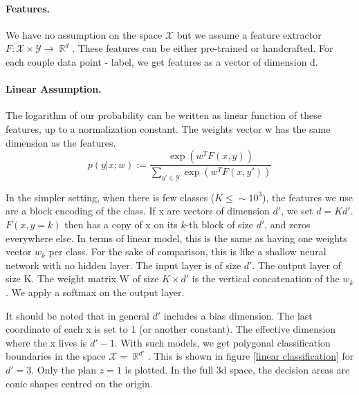 \documentclass{article}
\DeclareMathOperator{\R}{\mathbb{R}}
\DeclareMathOperator{\1}{\mathbb{1}}
\begin{document}
\paragraph{Features.}
We have no assumption on the space $\mathcal{X}$ but we assume a feature extractor $F:\mathcal{X}\times \mathcal{Y} \rightarrow \R^d$.
These features can be either pre-trained or handcrafted.
For each couple data point - label, we get features as a vector of dimension d.

\paragraph{Linear Assumption.}
The logarithm of our probability can be written as linear function of these features, up to a normalization constant.
The weights vector w has the same dimension as the features.
\begin{equation}
	\label{primal probability}
	p(y | x ; w) := \frac{\exp(w^TF(x, y))}{\sum_{y' \in \mathcal{Y}} \exp(w^TF(x, y'))}
\end{equation}

In the simpler setting, when there is few classes ($K \leq \sim 10^3$), the features we use are a block encoding of the class.
If x are vectors of dimension $d'$, we set $d=Kd'$. $F(x, y=k)$ then has a copy of x on its $k$-th block of size $d'$, and zeros everywhere else.
In terms of linear model, this is the same as having one weights vector $w_k$ per class.
For the sake of comparison, this is like a shallow neural network with no hidden layer.
The input layer is of size $d'$.
The output layer of size K.
The weight matrix W of size $K \times d'$ is the vertical concatenation of the $w_k$.
We apply a softmax on the output layer.

It should be noted that in general $d'$ includes a bias dimension.
The last coordinate of each x is set to 1 (or another constant).
The effective dimension where the x lives is $d'-1$.
With such models, we get polygonal classification boundaries in the space $\mathcal X = \R^{d'}$.
This is shown in figure \ref{linear classification} for $d'=3$.
Only the plan $z=1$ is plotted. In the full 3d space, the decision areas are conic shapes centred on the origin.
\end{document}
